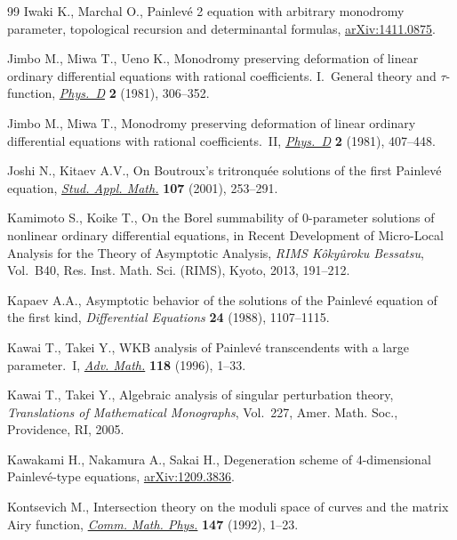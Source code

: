 \documentclass[pdftex]{sigma}
\theoremstyle{definition}
\numberwithin{equation}{section}
\begin{document}
\begin{thebibliography}{99}
Iwaki K., Marchal O., Painlev\'e 2 equation with arbitrary monodromy parameter,
  topological recursion and determinantal formulas, \href{http://arxiv.org/abs/1411.0875}{arXiv:1411.0875}.

Jimbo M., Miwa T., Ueno K., Monodromy preserving deformation of linear ordinary
  dif\/ferential equations with rational coef\/f\/icients. {I}.~{G}eneral theory and
  {$\tau $}-function, \href{http://dx.doi.org/10.1016/0167-2789(81)90013-0}{\textit{Phys.~D}} \textbf{2} (1981), 306--352.

Jimbo M., Miwa T., Monodromy preserving deformation of linear ordinary
  dif\/ferential equations with rational coef\/f\/icients.~{II}, \href{http://dx.doi.org/10.1016/0167-2789(81)90021-X}{\textit{Phys.~D}}
  \textbf{2} (1981), 407--448.

Joshi N., Kitaev A.V., On {B}outroux's tritronqu\'ee solutions of the f\/irst
  {P}ainlev\'e equation, \href{http://dx.doi.org/10.1111/1467-9590.00187}{\textit{Stud. Appl. Math.}} \textbf{107} (2001),
  253--291.

Kamimoto S., Koike T., On the {B}orel summability of 0-parameter solutions of
  nonlinear ordinary dif\/ferential equations, in Recent Development of
  Micro-Local Analysis for the Theory of Asymptotic Analysis, \textit{RIMS
  K\^oky\^uroku Bessatsu}, Vol.~B40, Res. Inst. Math. Sci. (RIMS), Kyoto, 2013,
  191--212.

Kapaev A.A., Asymptotic behavior of the solutions of the {P}ainlev\'e equation
  of the f\/irst kind, \textit{Differential Equations} \textbf{24} (1988),
  1107--1115.

Kawai T., Takei Y., W{KB} analysis of {P}ainlev\'e transcendents with a large
  parameter.~{I}, \href{http://dx.doi.org/10.1006/aima.1996.0016}{\textit{Adv. Math.}} \textbf{118} (1996), 1--33.

Kawai T., Takei Y., Algebraic analysis of singular perturbation theory,
  \textit{Translations of Mathematical Monographs}, Vol.~227, Amer. Math. Soc.,
  Providence, RI, 2005.

Kawakami H., Nakamura A., Sakai H., Degeneration scheme of 4-dimensional
  Painlev\'e-type equations, \href{http://arxiv.org/abs/1209.3836}{arXiv:1209.3836}.

Kontsevich M., Intersection theory on the moduli space of curves and the matrix
  {A}iry function, \href{http://dx.doi.org/10.1007/BF02099526}{\textit{Comm. Math. Phys.}} \textbf{147} (1992), 1--23.


\end{thebibliography}
\end{document}
